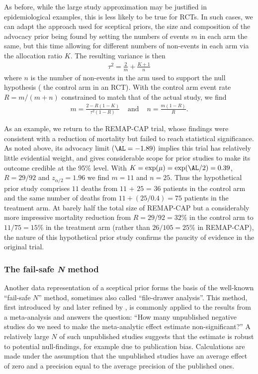 As before, while the large study approximation may be justified in
epidemiological examples, this is less likely to be true for RCTs. In such
cases, we can adapt the approach used for sceptical priors, the size and
composition of the advocacy prior being found by setting the numbers of events
$m$ in each arm the same, but this time allowing for different numbers of
non-events in each arm via the allocation ratio $K$. The resulting variance is
then
\begin{align*}
  \tau^{2} = \frac{2}{m} + \frac{K + 1}{n}
\end{align*}
where $n$ is the number of non-events in the arm used to support the null
hypothesis (\eg{} the control arm in an RCT). With the control arm event rate
$R = m/(m + n)$ constrained to match that of the actual study, we find
\begin{eqnarray*}
  m = \frac{2 - R(1 - K)}{\tau^{2}(1 - R)} & \mbox{ and }
  &n = \frac{m(1 - R)}{R}.
\end{eqnarray*}

As an example, we return to the REMAP-CAP trial, whose findings were consistent
with a reduction of mortality but failed to reach statistical significance. As
noted above, its advocacy limit ($\AL = -1.89)$ implies this trial has
relatively little evidential weight, and gives considerable scope for prior
studies to make its outcome credible at the 95\% level. With
$K = \exp(\mu) = \exp(\AL/2) = 0.39$, $R = 29/92$ and $z_{\alpha/2} = 1.96$ we
find $m = 11$ and $n = 25$. Thus the hypothetical prior study comprises $11$
deaths from $11$ + $25$ = $36$ patients in the control arm and the same number
of deaths from $11 + (25/0.4) = 75$ patients in the treatment arm. At barely
half the total size of REMAP-CAP but a considerably more impressive mortality
reduction from $R = 29/92 = 32\%$ in the control arm to $11/75=15$\% in the
treatment arm (rather than $26/105=25$\% in REMAP-CAP), the nature of this
hypothetical prior study confirms the paucity of evidence in the original trial.



\subsubsection{The fail-safe \textit{N} method}
Another data representation of a sceptical prior forms the basis of the
well-known ``fail-safe $N$'' method, sometimes also called ``file-drawer
analysis''. This method, first introduced by \citet{Rosenthal1979} and later
refined by \citet{Rosenberg2005}, is commonly applied to the results from a
meta-analysis and answers the question: ``How many unpublished negative studies
do we need to make the meta-analytic effect estimate non-significant?'' A
relatively large $N$ of such unpublished studies suggests that the estimate is
robust to potential null-findings, for example due to publication bias.
Calculations are made under the assumption that the unpublished studies have an
average effect of zero and a precision equal to the average precision of the
published ones.


